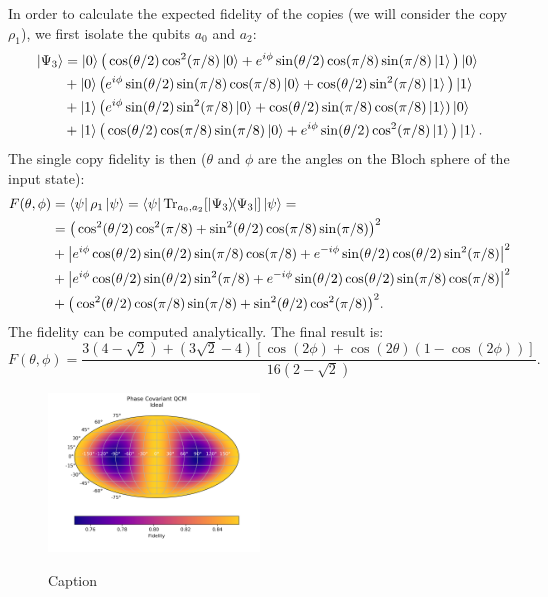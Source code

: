 In order to calculate the expected fidelity of the copies (we will consider the copy $\rho_{1}$), we first isolate the qubits $a_0$ and $a_2$:
\[
    \begin{split}
    \ket{\Psi_3}&=\ket{0}\big(\cos(\theta/2)\cos^2(\pi/8)\ket{0}+e^{i\phi}\sin(\theta/2)\cos(\pi/8)\sin(\pi/8)\ket{1}\big)\ket{0}\\
    &+\ket{0}\big(e^{i\phi}\sin(\theta/2)\sin(\pi/8)\cos(\pi/8)\ket{0}+\cos(\theta/2)\sin^2(\pi/8)\ket{1}\big)\ket{1}\\
    &+\ket{1}\big(e^{i\phi}\sin(\theta/2)\sin^2(\pi/8)\ket{0}+\cos(\theta/2)\sin(\pi/8)\cos(\pi/8)\ket{1})\ket{0}\\
    &+\ket{1}\big(\cos(\theta/2)\cos(\pi/8)\sin(\pi/8)\ket{0}+e^{i\phi}\sin(\theta/2)\cos^2(\pi/8)\ket{1}\big)\ket{1}.
    \end{split}
\]
The single copy fidelity is then ($\theta$ and $\phi$ are the angles on the Bloch sphere of the input state):
\[
    \begin{split}
    F(\theta,\phi)&=\bra{\psi}\rho_{1}\ket{\psi}=\bra{\psi}\Tr_{a_0,a_2}[\ketbra{\Psi_3}]\ket{\psi}=\\
    &=\big(\cos^2(\theta/2)\cos^2(\pi/8)+\sin^2(\theta/2)\cos(\pi/8)\sin(\pi/8)\big)^2\\
    &+\big|e^{i\phi}\cos(\theta/2)\sin(\theta/2)\sin(\pi/8)\cos(\pi/8)+e^{-i\phi}\sin(\theta/2)\cos(\theta/2)\sin^2(\pi/8)\big|^2\\
    &+\big|e^{i\phi}\cos(\theta/2)\sin(\theta/2)\sin^2(\pi/8)+e^{-i\phi}\sin(\theta/2)\cos(\theta/2)\sin(\pi/8)\cos(\pi/8)\big|^2\\
    &+\big(\cos^2(\theta/2)\cos(\pi/8)\sin(\pi/8)+\sin^2(\theta/2)\cos^2(\pi/8)\big)^2.
    \end{split}
\]
The fidelity can be computed analytically. The final result is:
\begin{equation}
    F(\theta,\phi)=\frac{3\left(4-\sqrt{2}\right)+\left(3\sqrt{2}-4\right)\left[\cos(2\phi)+\cos(2\theta)\left(1-\cos(2\phi)\right)\right]}{     16(2-\sqrt{2})   }.
\end{equation}
\begin{figure}[H]
    \centering
            \includegraphics[width=0.5\textwidth]{Figures/phase_covariant.png}
        \label{fig:phase_covariant}
        \caption{Caption}
\end{figure}
